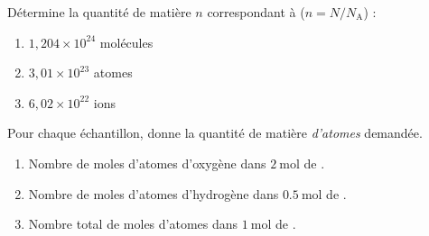 \documentclass[11pt,a4paper]{article}
\begin{document}
\begin{exo}
Détermine la quantité de matière $n$ correspondant à ($n = N/N_{\mathrm{A}}$) :
\begin{enumerate}[label=\alph*)]
  \item $1{,}204\times10^{24}$ molécules
  \item $3{,}01\times10^{23}$ atomes
  \item $6{,}02\times10^{22}$ ions
\end{enumerate}
\end{exo}

\begin{exo}
Pour chaque échantillon, donne la quantité de matière \emph{d'atomes} demandée.
\begin{enumerate}[label=\alph*)]
  \item Nombre de moles d'atomes d'oxygène dans $\SI{2}{\mole}$ de .
  \item Nombre de moles d'atomes d'hydrogène dans $\SI{0.5}{\mole}$ de .
  \item Nombre total de moles d'atomes dans $\SI{1}{\mole}$ de .
\end{enumerate}
\end{exo}
\end{document}

